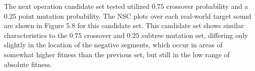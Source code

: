 \documentclass[12pt]{report} 	%
\numberwithin{figure}{chapter}
\numberwithin{table}{chapter}
\numberwithin{equation}{chapter}
\begin{document}
\begin{flushleft}
The next operation candidate set tested utilized $0.75$ crossover probability and a $0.25$ point mutation probability. The NSC plots over each real-world target sound are shown in Figure 5.8 for this candidate set.
This candidate set shows similar characteristics to the $0.75$ crossover and $0.25$ subtree mutation set, differing only slightly in the location of the negative segments, which occur in areas of somewhat higher fitness than the previous set, but still in the low range of absolute fitness.


\end{flushleft}
\end{document}
